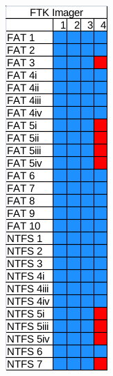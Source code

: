 \begin{figure}
\begin{subfigure}{0.16\linewidth}
    \end{subfigure}
    \begin{subfigure}{0.16\linewidth}
        \includegraphics[width=\linewidth]{fig/ftk_results.png}

\end{subfigure}
\end{figure}
